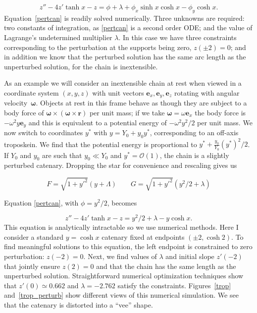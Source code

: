 \documentclass[pdflatex,sn-mathphys-num]{sn-jnl}%
\theoremstyle{thmstyleone}%
\theoremstyle{thmstyletwo}%
\theoremstyle{thmstylethree}%
\begin{document}
\begin{equation}\label{pertcan}
  z'' - 4z'\tanh x - z =
  \phi + \lambda + \phi_x\sinh x\cosh x - \phi_y\cosh x.
\end{equation}
%
Equation~\ref{pertcan} is readily solved numerically.  Three unknowns
are required: two constants of integration, as \ref{pertcan} is a
second order ODE; and the value of Lagrange's undetermined multiplier
$\lambda$.  In this case we have three constraints corresponding to
the perturbation at the supports being zero, $z(\pm 2)=0$; and in
addition we know that the perturbed solution has the same arc length
as the unperturbed solution, for the chain is inextensible.

As an example we will consider an inextensible chain at rest when
viewed in a coordinate system $(x,y,z)$ with unit vectors
$\boldsymbol{e}_x,\boldsymbol{e}_y,\boldsymbol{e}_z$ rotating with
angular velocity~$\boldsymbol{\omega}$.  Objects at rest in this frame
behave as though they are subject to a body force of
$\boldsymbol{\omega}\times\left(\boldsymbol{\omega}\times\boldsymbol{r}\right)$
per unit mass; if we take $\boldsymbol{\omega}=\omega\boldsymbol{e}_x$
the body force is $-\omega^2y\boldsymbol{e}_y$ and this is equivalent
to a potential energy of $-\omega^2y^2/2$ per unit mass.  We now
switch to coordinates $y^*$ with $y = Y_0 + y_0y^*$, corresponding to
an off-axis troposkein.  We find that the potential energy is
proportional to $y^*+\frac{y_0}{Y_0}\left(y^*\right)^2/2$.  If $Y_0$
and $y_0$ are such that $y_0\ll Y_0$ and $y^*={\mathcal O}(1)$, the
chain is a slightly perturbed catenary.  Dropping the star for
convenience and rescaling gives us

\begin{equation}
  F = \sqrt{1+y'^2}(y+\Lambda)\qquad
  G = \sqrt{1+y'^2}(y^2/2 + \lambda)
\end{equation}

Equation \ref{pertcan}, with $\phi=y^2/2$, becomes

\begin{equation}
  z'' - 4z'\tanh x - z = y^2/2 + \lambda -y\cosh x.
\end{equation}
%
This equation is analytically intractable so we use numerical methods.
Here I consider a standard $y=\cosh x$ catenary fixed at endpoints
$(\pm 2, \cosh 2)$.  To find meaningful solutions to this equation,
the left endpoint is constrained to zero perturbation: $z(-2)=0$.
Next, we find values of $\lambda$ and initial slope $z'(-2)$ that
jointly ensure $z(2)=0$ and that the chain has the same length as the
unperturbed solution.  Straightforward numerical optimization
techniques show that $z'(0)\simeq 0.662$ and $\lambda = -2.762$
satisfy the constraints.  Figures~\ref{trop} and~\ref{trop_perturb}
show different views of this numerical simulation.  We see that the
catenary is distorted into a ``vee'' shape.
\end{document}
